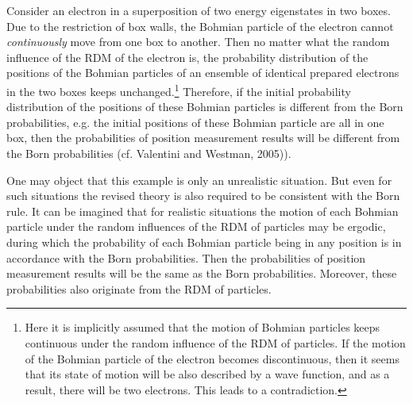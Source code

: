 Consider an electron in a superposition of two energy eigenstates in two boxes.
Due to the restriction of box walls, the Bohmian particle of the electron cannot \emph{continuously} move from one box to another.
Then no matter what the random influence of the RDM of the electron is,
the probability distribution of the positions of the Bohmian particles of an ensemble of identical prepared electrons in the two boxes keeps unchanged.\footnote{Here it is implicitly assumed that the motion of Bohmian particles keeps continuous under the random influence of the RDM of particles. If the motion of the Bohmian particle of the electron becomes discontinuous, then it seems that its state of motion will be also described by a wave function, and as a result, there will be two electrons. This leads to a contradiction.}
Therefore, if the initial probability distribution of the positions of these Bohmian particles is different from the Born probabilities, e.g. the initial positions of these Bohmian particle are all in one box,
then the probabilities of position measurement results will be different from the Born probabilities (cf. Valentini and Westman, 2005)). %

One may object that this example is only an unrealistic situation. But even for such situations the revised theory is also required to be consistent with the Born rule.
It can be imagined that for realistic situations the motion of each Bohmian particle under the random influences of the RDM of particles may be ergodic, during which the probability of each Bohmian particle being in any position is in accordance with the Born probabilities.
Then the probabilities of position measurement results will be the same as the Born probabilities. Moreover, these probabilities also originate from the RDM of particles.

